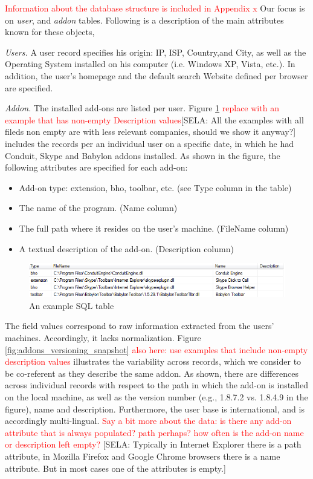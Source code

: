 \documentclass[11pt,oneside]{book}
\begin{document}
\textcolor{red}{Information about the database structure is included in Appendix x} Our focus is on {\it user}, and {\it addon} tables. Following is a description of the main attributes known for these objects,

{\it Users.} A user record specifies his origin: IP, ISP, Country,and City, as well as the Operating System installed on his computer (i.e. Windows XP, Vista, etc.). In addition, the user's homepage and the default search Website defined per browser are specified.

{\it Addon.} The installed add-ons are listed per user. Figure \ref{fig:db_addons_snapshot} \textcolor{red}{replace with an example that has non-empty Description values}[SELA: All the examples with all fileds non empty are with less relevant companies, should we show it anyway?] includes the records per an individual user on a specific date, in which he had Conduit, Skype and Babylon addons installed. As shown in the figure, the following attributes are specified for each add-on:
\begin{itemize}
\item Add-on type: extension, bho, toolbar, etc. (see Type column in the table)
\item The name of the program. (Name column)
\item The full path where it resides on the user's machine. (FileName column)
\item A textual description of the add-on. (Description column)
\end{itemize}

\begin{figure}[t]
\centering
\begin{small}
\includegraphics[scale=.8,angle=0]{figures/db_addons_snapshot.png}
\end{small}
\caption{An example SQL table}
\label{fig:db_addons_snapshot}
\end{figure}

The field values correspond to raw information extracted from the users' machines. Accordingly, it lacks normalization. Figure \ref{fig:addons_versioning_snapshot} \textcolor{red}{also here: use examples that include non-empty description values} illustrates the variability across records, which we consider to be co-referent as they describe the same addon. As shown, there are differences across individual records with respect to the path in which the add-on is installed on the local machine, as well as the version number (e.g., 1.8.7.2 vs. 1.8.4.9 in the figure), name and description. Furthermore, the user base is international, and is accordingly multi-lingual.  \textcolor{red}{Say a bit more about the data: is there any add-on attribute that is always populated? path perhaps? how often is the add-on name or description left empty?}
[SELA: Typically in Internet Explorer there is a path attribute, in Mozilla Firefox and Google Chrome browsers there is a name attribute. But in most cases one of the attributes is empty.]
\end{document}

